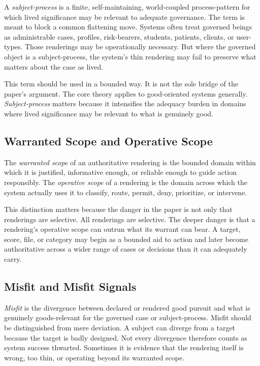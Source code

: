 \documentclass[11pt]{article}
\renewcommand{\emph}[1]{\textit{#1}}
\begin{document}
A \emph{subject-process} is a finite, self-maintaining, world-coupled process-pattern for which lived significance may be relevant to adequate governance. The term is meant to block a common flattening move. Systems often treat governed beings as administrable cases, profiles, risk-bearers, students, patients, clients, or user-types. Those renderings may be operationally necessary. But where the governed object is a subject-process, the system's thin rendering may fail to preserve what matters about the case as lived.\cite{Swanson2026EmbeddedProcess,Fricker2007EpistemicInjustice}

This term should be used in a bounded way. It is not the sole bridge of the paper's argument. The core theory applies to good-oriented systems generally. \emph{Subject-process} matters because it intensifies the adequacy burden in domains where lived significance may be relevant to what is genuinely good.

\subsection{Warranted Scope and Operative Scope}

The \emph{warranted scope} of an authoritative rendering is the bounded domain within which it is justified, informative enough, or reliable enough to guide action responsibly. The \emph{operative scope} of a rendering is the domain across which the system actually uses it to classify, route, permit, deny, prioritize, or intervene.

This distinction matters because the danger in the paper is not only that renderings are selective. All renderings are selective. The deeper danger is that a rendering's operative scope can outrun what its warrant can bear. A target, score, file, or category may begin as a bounded aid to action and later become authoritative across a wider range of cases or decisions than it can adequately carry.

\subsection{Misfit and Misfit Signals}

\emph{Misfit} is the divergence between declared or rendered good pursuit and what is genuinely goods-relevant for the governed case or subject-process. Misfit should be distinguished from mere deviation. A subject can diverge from a target because the target is badly designed. Not every divergence therefore counts as system success thwarted. Sometimes it is evidence that the rendering itself is wrong, too thin, or operating beyond its warranted scope.
\end{document}
